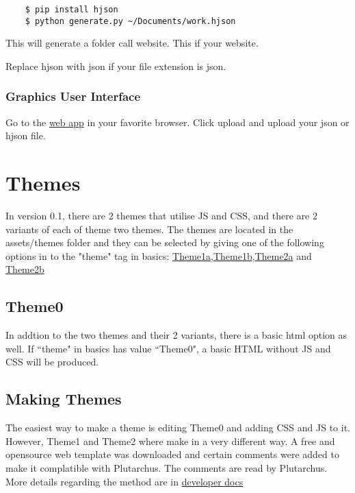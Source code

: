 \documentclass[12pt]{article}
\begin{document}
    \begin{verbatim}
    $ pip install hjson
    $ python generate.py ~/Documents/work.hjson 
    \end{verbatim}

    This will generate a folder call website. This if your website. 

    Replace hjson with json if your file extension is json. 
    
    \subsubsection{Graphics User Interface}

    Go to the \href{http://latinplutarchus/saner_json}{web app} in your favorite browser. Click upload and upload your json or hjson file. 

    \section{Themes}

    In version 0.1, there are 2 themes that utilise JS and CSS, and there are 2 variants of each of theme two themes. The themes are located in the assets/themes folder and they can be selected by giving one of the following options in to the "theme" tag in basics: \href{http://latinplutarchus/saner_json}{Theme1a},\href{http://latinplutarchus/saner_json}{Theme1b},\href{http://latinplutarchus/saner_json}{Theme2a} and \href{http://latinplutarchus/saner_json}{Theme2b}


    \subsection{Theme0}

    In addtion to the two themes and their 2 variants, there is a basic html option as well. If ``theme" in basics has value ``Theme0", a basic HTML without JS and CSS will be produced. 

    \subsection{Making Themes}

    The easiest way to make a theme is editing Theme0 and adding CSS and JS to it. However, Theme1 and Theme2 where make in a very different way. A free and opensource web template was downloaded and certain comments were added to make it complatible with Plutarchus. The comments are read by Plutarchus. More details regarding the method are in \href{http://latinplutarchus/saner_json}{developer docs}
\end{document}
